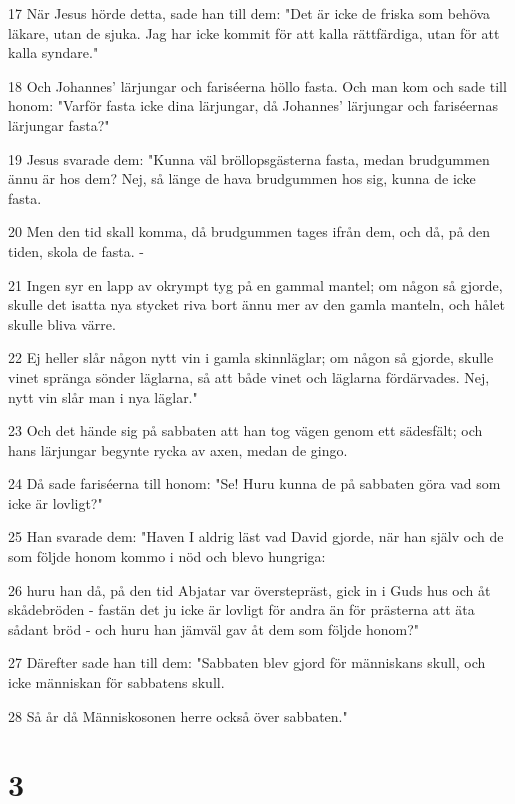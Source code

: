 \par 17 När Jesus hörde detta, sade han till dem: "Det är icke de friska som behöva läkare, utan de sjuka. Jag har icke kommit för att kalla rättfärdiga, utan för att kalla syndare."
\par 18 Och Johannes' lärjungar och fariséerna höllo fasta. Och man kom och sade till honom: "Varför fasta icke dina lärjungar, då Johannes' lärjungar och fariséernas lärjungar fasta?"
\par 19 Jesus svarade dem: "Kunna väl bröllopsgästerna fasta, medan brudgummen ännu är hos dem? Nej, så länge de hava brudgummen hos sig, kunna de icke fasta.
\par 20 Men den tid skall komma, då brudgummen tages ifrån dem, och då, på den tiden, skola de fasta. -
\par 21 Ingen syr en lapp av okrympt tyg på en gammal mantel; om någon så gjorde, skulle det isatta nya stycket riva bort ännu mer av den gamla manteln, och hålet skulle bliva värre.
\par 22 Ej heller slår någon nytt vin i gamla skinnläglar; om någon så gjorde, skulle vinet spränga sönder läglarna, så att både vinet och läglarna fördärvades. Nej, nytt vin slår man i nya läglar."
\par 23 Och det hände sig på sabbaten att han tog vägen genom ett sädesfält; och hans lärjungar begynte rycka av axen, medan de gingo.
\par 24 Då sade fariséerna till honom: "Se! Huru kunna de på sabbaten göra vad som icke är lovligt?"
\par 25 Han svarade dem: "Haven I aldrig läst vad David gjorde, när han själv och de som följde honom kommo i nöd och blevo hungriga:
\par 26 huru han då, på den tid Abjatar var överstepräst, gick in i Guds hus och åt skådebröden - fastän det ju icke är lovligt för andra än för prästerna att äta sådant bröd - och huru han jämväl gav åt dem som följde honom?"
\par 27 Därefter sade han till dem: "Sabbaten blev gjord för människans skull, och icke människan för sabbatens skull.
\par 28 Så år då Människosonen herre också över sabbaten."

\chapter{3}

